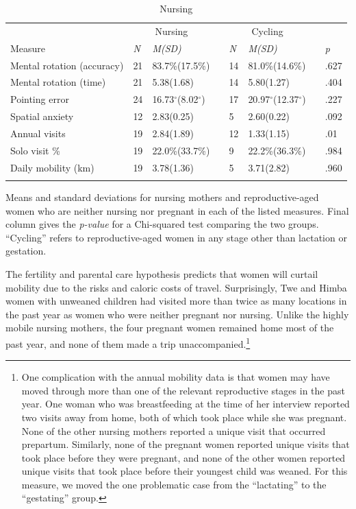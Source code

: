 \begin{table}[h!]
\caption{Nursing}
\label{tab:lact}  
\begin{tabular}{llllllll}
\hline\noalign{\smallskip}
& \multicolumn{2}{c}{Nursing} && \multicolumn{2}{c}{Cycling} && \\
Measure & \emph{N} & \emph{M(SD)} && \emph{N} & \emph{M(SD)} && \emph{p} \\
\noalign{\smallskip}\hline\noalign{\smallskip}
Mental rotation (accuracy) & 21 & 83.7\%(17.5\%) && 14 & 81.0\%(14.6\%) && .627 \\
Mental rotation (time) & 21 & 5.38(1.68) && 14 & 5.80(1.27) && .404 \\
Pointing error & 24 & 16.73$^{\circ}$(8.02$^{\circ}$) && 17 & 20.97$^{\circ}$(12.37$^{\circ}$) && .227 \\
Spatial anxiety & 12 & 2.83(0.25) && 5 & 2.60(0.22) && .092 \\
Annual visits & 19 & 2.84(1.89) && 12 & 1.33(1.15) && .01 \\
Solo visit \% & 19 & 22.0\%(33.7\%) && 9 & 22.2\%(36.3\%) && .984 \\
Daily mobility (km) & 19 & 3.78(1.36) && 5 & 3.71(2.82) && .960 \\
\noalign{\smallskip}\hline
\end{tabular}\par
\bigskip
Means and standard deviations for nursing mothers and reproductive-aged women who are neither nursing nor pregnant in each of the listed measures. Final column gives the \emph{p-value} for a Chi-squared test comparing the two groups.  ``Cycling'' refers to reproductive-aged women in any stage other than lactation or gestation.  
\end{table}	

The fertility and parental care hypothesis predicts that women will curtail mobility due to the risks and caloric costs of travel.  Surprisingly, Twe and Himba women with unweaned children had visited more than twice as many locations in the past year as women who were neither pregnant nor nursing.  Unlike the highly mobile nursing mothers, the four pregnant women remained home most of the past year, and none of them made a trip unaccompanied.\footnote{One complication with the annual mobility data is that women may have moved through more than one of the relevant reproductive stages in the past year. One woman who was breastfeeding at the time of her interview reported two visits away from home, both of which took place while she was pregnant.  None of the other nursing mothers reported a unique visit that occurred prepartum.  Similarly, none of the pregnant women reported unique visits that took place before they were pregnant, and none of the other women reported unique visits that took place before their youngest child was weaned.  For this measure, we moved the one problematic case from the ``lactating'' to the ``gestating'' group.}


